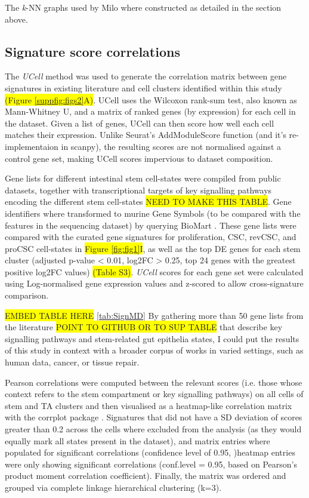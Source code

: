 The \emph{k}-NN graphs used by Milo where constructed as detailed in the section above.

\subsection*{Signature score correlations}

The \textit{UCell} \cite{andreatta_ucell_2021} method was used to generate the correlation matrix between gene signatures in existing literature and cell clusters identified within this study \colorbox{yellow}{(Figure \ref{suppfig:figs2}A)}. UCell uses the Wilcoxon rank-sum test, also known as Mann-Whitney U, and a matrix of ranked genes (by expression) for each cell in the dataset. Given a list of genes, UCell can then score how well each cell matches their expression. Unlike Seurat's AddModuleScore function (and it's re-implementaion in scanpy), the resulting scores are not normalised against a control gene set, making UCell scores impervious to dataset composition. 

Gene lists for different intestinal stem cell-states were compiled from public datasets, together with transcriptional targets of key signalling pathways encoding the different stem cell-states \colorbox{yellow}{NEED TO MAKE THIS TABLE}. Gene identifiers where transformed to murine Gene Symbols (to be compared with the features in the sequencing dataset) by querying BioMart \cite{smedley_biomart_2009}. These gene lists were compared with the curated gene signatures for proliferation, CSC, revCSC, and proCSC cell-states in \colorbox{yellow}{Figure \ref{fig:fig1}I}, as well as the top DE genes for each stem cluster (adjusted p-value < 0.01, log2FC > 0.25, top 24 genes with the greatest positive log2FC values) \colorbox{yellow}{(Table S3)}. \textit{UCell} scores for each gene set were calculated using Log-normalised gene expression values and z-scored to allow cross-signature comparison.

\colorbox{yellow}{EMBED TABLE HERE}
\ref{tab:SignMD}
By gathering more than 50 gene lists from the literature \colorbox{yellow}{POINT TO GITHUB OR TO SUP TABLE} that describe key signalling pathways and stem-related gut epithelia states, I could put the results of this study in context with a broader corpus of works in varied settings, such as human data, cancer, or tissue repair.

Pearson correlations were computed between the relevant scores (i.e. those whose context refers to the stem compartment or key signalling pathways) on all cells of stem and TA clusters and then visualised as a heatmap-like correlation matrix with the corrplot package \cite{wei_r_2021}. Signatures that did not have a SD deviation of scores greater than 0.2 across the cells where excluded from the analysis (as they would equally mark all states present in the dataset), and matrix entries where populated for significant correlations (confidence level of 0.95, )heatmap entries were only showing significant correlations (conf.level = 0.95, based on Pearson's product moment correlation coefficient). Finally, the matrix was ordered and grouped via complete linkage hierarchical clustering (k=3). 



